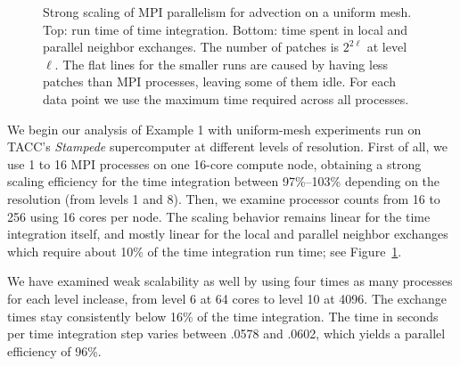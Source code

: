 \documentclass{IOS-Book-Article}     %
\newcommand{\Fig}[1]{Figure~\ref{fig:#1}}
\begin{document}
\begin{figure}
\begin{center}
\end{center}
\caption{Strong scaling of MPI parallelism for advection on a uniform mesh.
  Top: run time of time integration.  Bottom: time spent in local and parallel
  neighbor exchanges.  The number of patches is $2^{2 \ell}$ at level $\ell$.
  The flat lines for the smaller runs are caused by having
  less patches than MPI processes, leaving some of them idle.  For each data point
  we use the maximum time required across all processes.}
\label{fig:uniscale}
\end{figure}%
We begin our analysis of Example 1 with uniform-mesh experiments run on TACC's
\emph{Stampede} supercomputer at different levels of resolution.  First of all,
we use 1 to 16 MPI processes on one 16-core compute node, obtaining a strong
scaling efficiency for the time integration between 97\%--103\% depending on
the resolution (from levels 1 and 8).  Then, we examine processor counts from
16 to 256 using 16 cores per node.  The scaling behavior remains linear for
the time integration itself, and mostly linear for the local and parallel
neighbor exchanges which require about 10\% of the time integration run time;
see \Fig{uniscale}.

We have examined weak scalability as well by using four times as many processes
for each level inclease, from level 6 at 64 cores to level 10 at 4096.  The
exchange times stay consistently below 16\% of the time integration.  The time
in seconds per time integration step varies between .0578 and .0602,
which yields a parallel efficiency of 96\%. 
\end{document}
